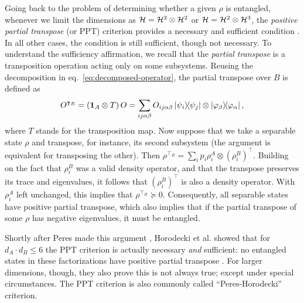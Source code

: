 		Going back to the problem of determining whether a given $\rho$ is entangled, whenever we limit the dimensions as $\mathcal{H} = \mathcal{H}^{2} \otimes \mathcal{H}^{2}$ or $\mathcal{H} = \mathcal{H}^{2} \otimes \mathcal{H}^{3}$, the \emph{positive partial transpose} (or PPT) criterion provides a necessary and sufficient condition \cite{peres_1996_ppt,horodecki_1996_ppt}. In all other cases, the condition is still sufficient, though not necessary. To understand the sufficiency affirmation, we recall that the \emph{partial transpose} is a transposition operation acting only on some subsystems. Reusing the decomposition in eq.~\eqref{eq:decomposed-operator}, the partial transpose over $B$ is defined as
		$$
			O^{\intercal_B} = (\mathbf{1}_A \otimes T)\,O = \sum_{ij\alpha\beta} O_{ij\alpha\beta} \ketbra{\psi_i}{\psi_j} \otimes \ketbra{\varphi_\beta}{\varphi_\alpha} , 
		$$
		where $T$ stands for the transposition map. Now suppose that we take a separable state $\rho$ and transpose, for instance, its second subsystem (the argument is equivalent for transposing the other). Then $\rho^{\intercal_B} = \sum_i p_i \rho_i^A \otimes \left( \rho_i^B \right)^\intercal$. Building on the fact that $\rho_i^B$ was a valid density operator, and that the transpose preserves its trace and eigenvalues, it follows that $\left( \rho_i^B \right)^\intercal$ is also a density operator. With $\rho_i^A$ left unchanged, this implies that $\rho^{\intercal_B} \succeq 0$. Consequently, all separable states have positive partial transpose, which also implies that if the partial transpose of some $\rho$ has negative eigenvalues, it must be entangled.
	
		Shortly after Peres made this argument \cite{peres_1996_ppt}, Horodecki et al. showed that for $d_A \cdot d_B \leq 6$ the PPT criterion is actually necessary \emph{and} sufficient: no entangled states in these factorizations have positive partial transpose \cite{horodecki_1996_ppt}. For larger dimensions, though, they also prove this is not always true; except under special circumstances. The PPT criterion is also commonly called ``Peres-Horodecki'' criterion. 
	
